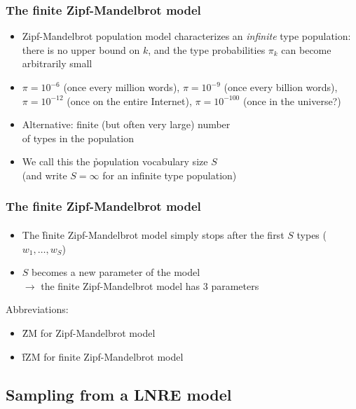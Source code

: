 \documentclass[handout,notes=show,t]{beamer} %
\begin{document}
\begin{frame}
  \frametitle{The finite Zipf-Mandelbrot model}

  \begin{itemize}
  \item Zipf-Mandelbrot population model characterizes an \emph{infinite} type
    population: there is no upper bound on $k$, and the type probabilities
    $\pi_k$ can become arbitrarily small
  \item $\pi = 10^{-6}$ (once every million words), $\pi = 10^{-9}$ (once
    every billion words), $\pi = 10^{-12}$ (once on the entire Internet), $\pi
    = 10^{-100}$ (once in the universe?)%
    \pause
  \item Alternative: finite (but often very large) number\\
    of types in the population
  \item We call this the \h{population vocabulary size} $S$\\
    (and write $S = \infty$ for an infinite type population)
  \end{itemize}
\end{frame}

\begin{frame}
  \frametitle{The finite Zipf-Mandelbrot model}
  \framesubtitle{\citet{Evert:04}}

  \begin{itemize}
  \item The \h{finite Zipf-Mandelbrot} model simply stops after the first $S$
    types ($w_1, \ldots, w_S$)
  \item $S$ becomes a new parameter of the model\\
    $\to$ the finite Zipf-Mandelbrot model has 3 parameters
  \end{itemize}

  Abbreviations: 
  \begin{itemize}
  \item \h{ZM} for Zipf-Mandelbrot model
  \item \h{fZM} for finite Zipf-Mandelbrot model
  \end{itemize}
\end{frame}

\subsection{Sampling from a LNRE model}
\end{document}
